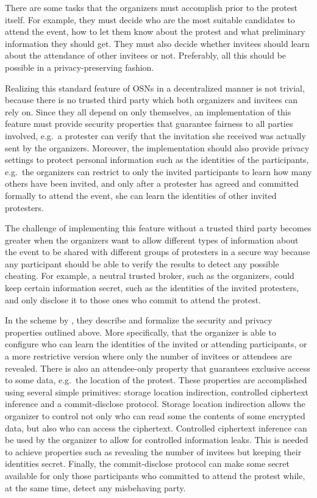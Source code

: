 There are some tasks that the organizers must accomplish prior to the protest 
itself.
For example, they must decide who are the most suitable candidates to attend 
the event, how to let them know about the protest and what preliminary 
information they should get.
They must also decide whether invitees should learn about the attendance of 
other invitees or not.
Preferably, all this should be possible in a privacy-preserving
fashion. %

Realizing this standard feature of \acp{OSN} in a decentralized manner is not 
trivial, because there is no trusted third party which both organizers and 
invitees can rely on. %
Since they %
 all depend on only themselves, an implementation of this feature 
must provide security properties that guarantee fairness to all parties 
involved, e.g.\  a protester can verify that the invitation she received was 
actually sent by the organizers.
Moreover, the implementation should also provide privacy settings to protect 
personal information such as the identities of the participants, e.g.\ the 
organizers can restrict to only the invited participants to learn how many 
others have been invited, and only after a protester has agreed and committed 
formally to attend the event, she can learn the identities of other invited 
protesters.

The challenge of implementing this feature without a trusted third party 
becomes greater when the organizers want to allow different types of 
information about the event to be shared with different groups of protesters in 
a secure way because any participant should be able to verify the results to 
detect any possible cheating.
For example, a neutral trusted broker, such as the organizers, could keep 
certain information secret, such as the identities of the invited protesters, 
and only disclose it to those ones who commit to attend the protest. 

In the scheme by \citet{EventsInvitations}, they describe and formalize the 
security and privacy properties outlined above.
More specifically, that the organizer is able to configure who can learn the 
identities of the invited or attending participants, or a more restrictive 
version where only the number of invitees or attendees are revealed.
There is also an attendee-only property that guarantees exclusive access to 
some data, e.g.\ the location of the protest.
These properties are accomplished using several simple primitives:
storage location indirection, controlled ciphertext inference and 
a commit-disclose protocol.
Storage location indirection allows the organizer to control not only who can 
read some the contents of some encrypted data, but also who can access the 
ciphertext.
Controlled ciphertext inference can be used by the organizer to allow for 
controlled information leaks.
This is needed to achieve properties such as revealing the number of invitees 
but keeping their identities secret.
Finally, the commit-disclose protocol can make some secret available for only 
those participants who committed to attend the protest while, at the same time, 
detect any misbehaving party.
